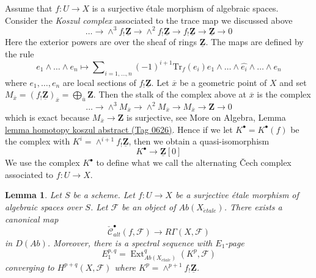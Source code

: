 \documentclass{amsart}
\theoremstyle{plain}
\newtheorem{lemma}[subsection]{Lemma}
\theoremstyle{definition}
\theoremstyle{remark}
\numberwithin{equation}{subsection}
\def\Ext{\mathop{\mathrm{Ext}}\nolimits}
\def\etale{{\acute{e}tale}}
\begin{document}
\medskip\noindent
Assume that $f : U \to X$ is a surjective \'etale
morphism of algebraic spaces. Consider the {\it Koszul complex}
associated to the trace map we discussed above
$$
\ldots \to \wedge^3f_!\underline{\mathbf{Z}} \to
\wedge^2f_!\underline{\mathbf{Z}} \to f_!\underline{\mathbf{Z}} \to
\underline{\mathbf{Z}} \to 0
$$
Here the exterior powers are over the sheaf of rings $\underline{\mathbf{Z}}$.
The maps are defined by the rule
$$
e_1 \wedge \ldots \wedge e_n \longmapsto
\sum\nolimits_{i = 1, \ldots, n} (-1)^{i + 1}
\text{Tr}_f(e_i)
e_1 \wedge \ldots \wedge \widehat{e_i} \wedge \ldots \wedge e_n
$$
where $e_1, \ldots, e_n$ are local sections of $f_!\underline{\mathbf{Z}}$.
Let $\overline{x}$ be a geometric point of $X$ and set
$M_{\overline{x}} = (f_!\underline{\mathbf{Z}})_{\overline{x}} =
\bigoplus_{\overline{u}} \mathbf{Z}$. Then the stalk of the complex above at
$\overline{x}$ is the complex
$$
\ldots \to \wedge^3 M_{\overline{x}} \to \wedge^2 M_{\overline{x}}
\to M_{\overline{x}} \to \mathbf{Z} \to 0
$$
which is exact because $M_{\overline{x}} \to \mathbf{Z}$ is surjective, see
More on Algebra, Lemma \href{https://stacks.math.columbia.edu/tag/0626}{lemma homotopy koszul abstract (Tag 0626)}.
Hence if we let $K^\bullet = K^\bullet(f)$ be the complex with
$K^i = \wedge^{i + 1}f_!\underline{\mathbf{Z}}$, then we obtain a
quasi-isomorphism
\begin{equation}
\label{equation-quasi-isomorphism}
K^\bullet \longrightarrow \underline{\mathbf{Z}}[0]
\end{equation}
We use the complex $K^\bullet$ to define what we call
the alternating {\v C}ech complex associated to $f : U \to X$.



\begin{lemma}
\label{lemma-alternating-cech-to-cohomology}
Let $S$ be a scheme. Let $f : U \to X$ be a surjective \'etale morphism
of algebraic spaces over $S$. Let $\mathcal{F}$ be an object of
$\textit{Ab}(X_\etale)$. There exists a canonical map
$$
\check{\mathcal{C}}^\bullet_{alt}(f, \mathcal{F})
\longrightarrow
R\Gamma(X, \mathcal{F})
$$
in $D(\textit{Ab})$. Moreover, there is a spectral sequence with $E_1$-page
$$
E_1^{p, q} =
\Ext_{\textit{Ab}(X_\etale)}^q(K^p, \mathcal{F})
$$
converging to $H^{p + q}(X, \mathcal{F})$ where
$K^p = \wedge^{p + 1}f_!\underline{\mathbf{Z}}$.
\end{lemma}
\end{document}
